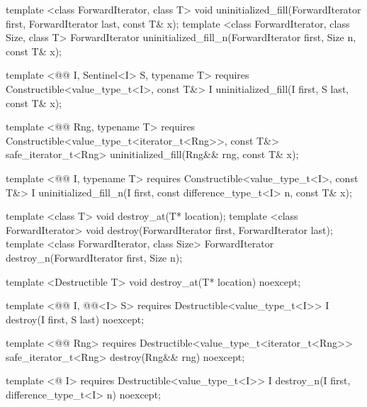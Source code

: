 {\color{remclr}
\begin{codeblock}
template <class ForwardIterator, class T>
  void uninitialized_fill(ForwardIterator first, ForwardIterator last,
                          const T& x);
template <class ForwardIterator, class Size, class T>
  ForwardIterator uninitialized_fill_n(ForwardIterator first, Size n, const T& x);
\end{codeblock}
} %
{\color{addclr}
\begin{codeblock}
template <@@ I, Sentinel<I> S, typename T>
  requires
Constructible<value_type_t<I>, const T&>
  I uninitialized_fill(I first, S last, const T& x);

template <@@ Rng, typename T>
  requires
Constructible<value_type_t<iterator_t<Rng>>, const T&>
  safe_iterator_t<Rng> uninitialized_fill(Rng&& rng, const T& x);

template <@@ I, typename T>
  requires
Constructible<value_type_t<I>, const T&>
  I uninitialized_fill_n(I first, const difference_type_t<I> n, const T& x);
\end{codeblock}
} %
{\color{remclr}
\begin{codeblock}
template <class T>
  void destroy_at(T* location);
template <class ForwardIterator>
  void destroy(ForwardIterator first, ForwardIterator last);
template <class ForwardIterator, class Size>
  ForwardIterator destroy_n(ForwardIterator first, Size n);
\end{codeblock}
} %
{\color{addclr}
\begin{codeblock}
template <Destructible T>
  void destroy_at(T* location) noexcept;

template <@@ I, @@<I> S>
  requires
Destructible<value_type_t<I>>
  I destroy(I first, S last) noexcept;

template <@@ Rng>
  requires
Destructible<value_type_t<iterator_t<Rng>>
  safe_iterator_t<Rng> destroy(Rng&& rng) noexcept;

template <@ I>
  requires
Destructible<value_type_t<I>>
  I destroy_n(I first, difference_type_t<I> n) noexcept;
\end{codeblock}
} %

